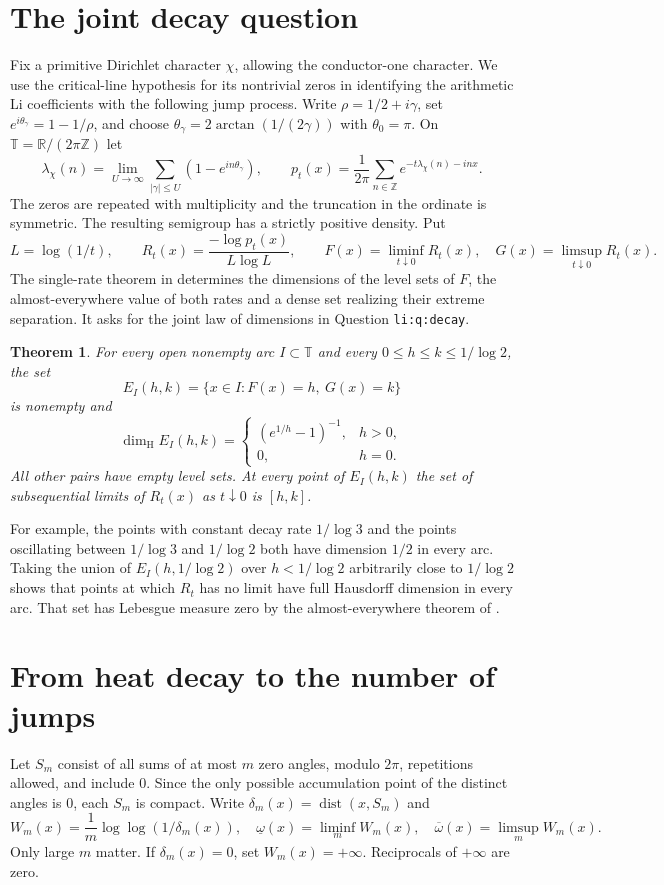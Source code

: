 \documentclass[11pt]{article}
\newtheorem{theorem}{Theorem}[section]
\newcommand{\HH}{\dim_{\mathrm H}}
\newcommand{\TT}{\mathbb T}
\newcommand{\dist}{\operatorname{dist}}
\newcommand{\ro}{\rho}
\newcommand{\RR}{\mathbb R}
\newcommand{\upexp}{\overline\omega}
\newcommand{\lowexp}{\underline\omega}
\newcommand{\ranked}[1]{\textup{\texttt{#1}}}
\begin{document}
\section{The joint decay question}
Fix a primitive Dirichlet character $\chi$, allowing the conductor-one character. We use the critical-line hypothesis for its nontrivial zeros in identifying the arithmetic Li coefficients with the following jump process. Write $\ro=1/2+i\gamma$, set $e^{i\theta_\gamma}=1-1/\ro$, and choose $\theta_\gamma=2\arctan(1/(2\gamma))$ with $\theta_0=\pi$. On $\TT=\RR/(2\pi\mathbb Z)$ let
\[
 \lambda_\chi(n)=\lim_{U\to\infty}\sum_{|\gamma|\le U}(1-e^{in\theta_\gamma}),
 \qquad p_t(x)=\frac1{2\pi}\sum_{n\in\mathbb Z}e^{-t\lambda_\chi(n)-inx}.
\]
The zeros are repeated with multiplicity and the truncation in the ordinate is symmetric. The resulting semigroup has a strictly positive density. Put
\[
 L=\log(1/t),\qquad R_t(x)=\frac{-\log p_t(x)}{L\log L},\qquad
 F(x)=\liminf_{t\downarrow0}R_t(x),\quad G(x)=\limsup_{t\downarrow0}R_t(x).
\]
The single-rate theorem in \cite{repoLi} determines the dimensions of the level sets of $F$, the almost-everywhere value of both rates and a dense set realizing their extreme separation. It asks for the joint law of dimensions in Question \ranked{li:q:decay}.
\begin{theorem}\label{th:main}
For every open nonempty arc $I\subset\TT$ and every $0\le h\le k\le1/\log2$, the set
\[
 E_I(h,k)=\{x\in I:F(x)=h,\ G(x)=k\}
\]
is nonempty and
\[
 \HH E_I(h,k)=\begin{cases}
 (e^{1/h}-1)^{-1},&h>0,\\ 0,&h=0.
 \end{cases}
\]
All other pairs have empty level sets. At every point of $E_I(h,k)$ the set of subsequential limits of $R_t(x)$ as $t\downarrow0$ is $[h,k]$.
\end{theorem}
For example, the points with constant decay rate $1/\log3$ and the points oscillating between $1/\log3$ and $1/\log2$ both have dimension $1/2$ in every arc. Taking the union of $E_I(h,1/\log2)$ over $h<1/\log2$ arbitrarily close to $1/\log2$ shows that points at which $R_t$ has no limit have full Hausdorff dimension in every arc. That set has Lebesgue measure zero by the almost-everywhere theorem of \cite{repoRec}.

\section{From heat decay to the number of jumps}
Let $S_m$ consist of all sums of at most $m$ zero angles, modulo $2\pi$, repetitions allowed, and include $0$. Since the only possible accumulation point of the distinct angles is $0$, each $S_m$ is compact. Write $\delta_m(x)=\dist(x,S_m)$ and
\[
 W_m(x)=\frac1m\log\log(1/\delta_m(x)),\quad
 \lowexp(x)=\liminf_m W_m(x),\quad \upexp(x)=\limsup_m W_m(x).
\]
Only large $m$ matter. If $\delta_m(x)=0$, set $W_m(x)=+\infty$. Reciprocals of $+\infty$ are zero.
\end{document}
